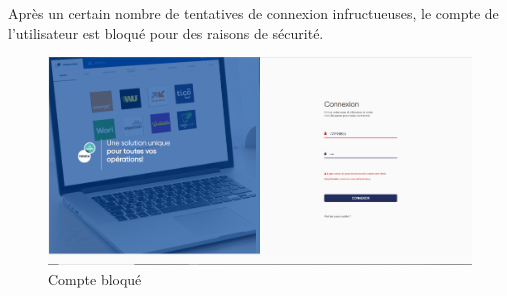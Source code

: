Après un certain nombre de tentatives de connexion infructueuses, le compte de l'utilisateur est bloqué pour des raisons de sécurité.
\begin{figure}[H]
	\centering
	\begin{minipage}{12cm}
		\centering
		\includegraphics[width=1\textwidth]{fig/compte-bloque.PNG}
	\end{minipage}
	\caption{Compte bloqué}
	\label{fig:sfds}
\end{figure}
